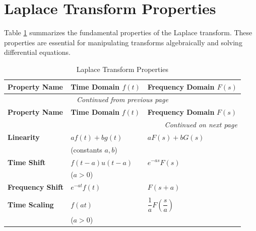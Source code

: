 \section{Laplace Transform Properties}
\label{sec:laplace_properties}

Table \ref{tab:laplace_properties} summarizes the fundamental properties of the Laplace transform. These properties are essential for manipulating transforms algebraically and solving differential equations.

\begin{longtable}{lll}
    \caption{Laplace Transform Properties}
    \label{tab:laplace_properties} \\

    \toprule
    \textbf{Property Name} & \textbf{Time Domain } $f(t)$ & \textbf{Frequency Domain } $F(s)$ \\
    \midrule
    \endfirsthead

    \multicolumn{3}{c}{\textit{Continued from previous page}} \\
    \midrule
    \textbf{Property Name} & \textbf{Time Domain } $f(t)$ & \textbf{Frequency Domain } $F(s)$ \\
    \midrule
    \endhead

    \midrule
    \multicolumn{3}{r}{\textit{Continued on next page}} \\
    \endfoot

    \bottomrule
    \endlastfoot

    \textbf{Linearity} & $a f(t) + b g(t)$ & $a F(s) + b G(s)$ \\
    & (constants $a, b$) & \\

    \textbf{Time Shift} & $f(t - a)u(t-a)$ & $e^{-as} F(s)$ \\
    & ($a > 0$) & \\

    \textbf{Frequency Shift} & $e^{-at} f(t)$ & $F(s + a)$ \\
    & & \\

    \textbf{Time Scaling} & $f(at)$ & $\dfrac{1}{a} F\left(\dfrac{s}{a}\right)$ \\
    & ($a > 0$) & \\


\end{longtable}
